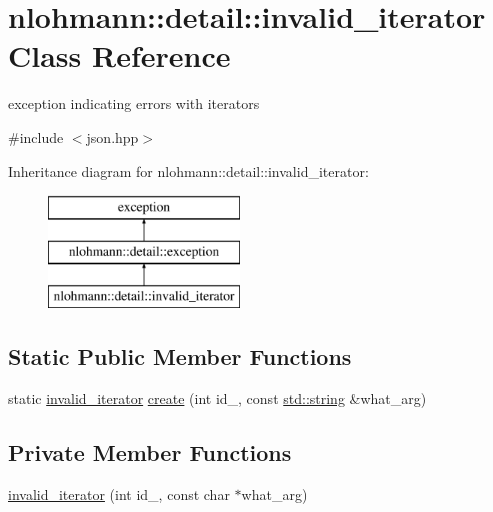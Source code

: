 \hypertarget{classnlohmann_1_1detail_1_1invalid__iterator}{}\section{nlohmann\+::detail\+::invalid\+\_\+iterator Class Reference}
\label{classnlohmann_1_1detail_1_1invalid__iterator}


exception indicating errors with iterators  




{\ttfamily \#include $<$json.\+hpp$>$}

Inheritance diagram for nlohmann\+::detail\+::invalid\+\_\+iterator\+:\begin{figure}[H]
\begin{center}
\leavevmode
\includegraphics[height=3.000000cm]{d4/d5f/classnlohmann_1_1detail_1_1invalid__iterator}
\end{center}
\end{figure}
\subsection*{Static Public Member Functions}
\begin{DoxyCompactItemize}
\item 
static \mbox{\hyperlink{classnlohmann_1_1detail_1_1invalid__iterator}{invalid\+\_\+iterator}} \mbox{\hyperlink{classnlohmann_1_1detail_1_1invalid__iterator_a4e849260a3caa1b288c7e619130c6c09}{create}} (int id\+\_\+, const \mbox{\hyperlink{namespacenlohmann_1_1detail_a1ed8fc6239da25abcaf681d30ace4985ab45cffe084dd3d20d928bee85e7b0f21}{std\+::string}} \&what\+\_\+arg)
\end{DoxyCompactItemize}
\subsection*{Private Member Functions}
\begin{DoxyCompactItemize}
\item 
\mbox{\hyperlink{classnlohmann_1_1detail_1_1invalid__iterator_adf4a6697420f3bddb4addfc0b98f6ee2}{invalid\+\_\+iterator}} (int id\+\_\+, const char $\ast$what\+\_\+arg)
\end{DoxyCompactItemize}
